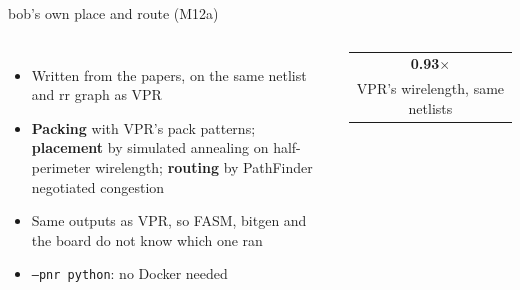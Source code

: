 \documentclass[aspectratio=169,11pt]{beamer}
\makeatletter
\newcommand{\kpi}[2]{\begin{tabular}{@{}c@{}}{\Large\bfseries\color{bobteal}#1}\\[-2pt]{\scriptsize\color{bobmute}#2}\end{tabular}}
\makeatother
\begin{document}
\begin{frame}{bob's own place and route (M12a)}
  \begin{columns}[c]
    \small
    \begin{itemize}
      \item Written from the papers, on the same netlist and rr graph as VPR
      \item \textbf{Packing} with VPR's pack patterns; \textbf{placement} by simulated annealing on half-perimeter wirelength; \textbf{routing} by PathFinder negotiated congestion
      \item Same outputs as VPR, so FASM, bitgen and the board do not know which one ran
      \item \texttt{--pnr python}: no Docker needed
    \end{itemize}
    \centering
    \vspace{1mm}

    \kpi{0.93$\times$}{VPR's wirelength, same netlists}
  \end{columns}
\end{frame}

\end{document}
